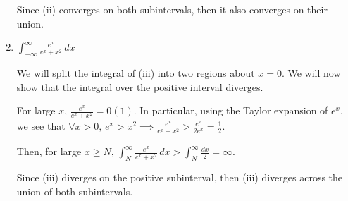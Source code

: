 \documentclass[../hw1]{subfiles}
\begin{document}
\begin{problem}[3]
\begin{enumerate}[label=\roman*)]
	      Since (ii) converges on both subintervals, then it also converges on their union.

	\item $\int_{-\infty}^{\infty} \frac{e^x}{e^x + x^2} \,dx$

	      We will split the integral of (iii) into two regions about $x=0$.
	      We will now show that the integral over the positive interval diverges.

	      For large $x$, $\frac{e^x}{e^x+x^2} = 0(1)$.
	      In particular, using the Taylor expansion of $e^x$,
	      we see that $\forall x>0,\, e^x>x^2 \implies \frac{e^x}{e^x + x^2} > \frac{e^x}{2e^x} = \frac{1}{2}$.

	      Then, for large $x\ge N$, $\int_{N}^{\infty} \frac{e^x}{e^x + x^2} \,dx > \int_{N}^{\infty} \frac{dx}{2} = \infty$.

	      Since (iii) diverges on the positive subinterval, then (iii) diverges across the union of both subintervals.
\end{enumerate}
\end{problem}
\end{document}
